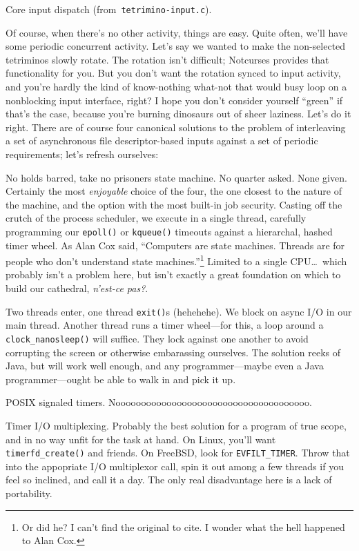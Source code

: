 \begin{listing}[!htbp]
\inputminted[]{C}{code/tetrimino-inputcore.h}
\caption{Core input dispatch (from~\texttt{tetrimino-input.c}).}
\label{list:tetrimino-inputcore}
\end{listing}

Of course, when there's no other activity, things are easy. Quite often, we'll
have some periodic concurrent activity. Let's say we wanted to make the non-selected
tetriminos slowly rotate. The rotation isn't difficult; Notcurses provides
that functionality for you. But you don't want the rotation synced to input
activity, and you're hardly the kind of know-nothing what-not that would
busy loop on a nonblocking input interface, right? I hope you don't consider
yourself ``green'' if that's the case, because you're burning dinosaurs out
of sheer laziness. Let's do it right. There are of course four canonical
solutions to the problem of interleaving a set of asynchronous file descriptor-based
inputs against a set of periodic requirements; let's refresh ourselves:

\begin{denseitemize}
\item{No holds barred, take no prisoners state machine. No quarter asked.
    None given. Certainly the most \textit{enjoyable} choice of the four, the
    one closest to the nature of the machine, and the option with the most
    built-in job security. Casting off the crutch of the process scheduler, we
    execute in a single thread, carefully programming our
    \texttt{epoll()}\cite{epoll7} or \texttt{kqueue()}\cite{kqueue2} timeouts
    against a hierarchal, hashed timer wheel\cite{timerwheels}. As Alan Cox
    said, ``Computers are state machines. Threads are for people who don't
    understand state machines.''\footnote{Or did he? I can't find the original
    to cite. I wonder what the hell happened to Alan Cox.} Limited to a single
  CPU\ldots\ which probably isn't a problem here, but isn't exactly a great foundation
  on which to build our cathedral, \textfrench{\textit{n'est-ce pas?}}.}
\item{Two threads enter, one thread \texttt{exit()}s (hehehehe). We block on
    async I/O in our main thread. Another thread runs a timer wheel---for this,
    a loop around a \texttt{clock\_nanosleep()} will suffice. They
    lock against one another to avoid corrupting the screen or otherwise
    embarassing ourselves. The solution reeks of Java, but will work well
    enough, and any programmer---maybe even a Java programmer---ought be able
    to walk in and pick it up.}
\item{POSIX signaled timers. Noooooooooooooooooooooooooooooooooooooo.}
\item{Timer I/O multiplexing. Probably the best solution for a program of true
    scope, and in no way unfit for the task at hand. On Linux, you'll want
    \texttt{timerfd\_create()} and friends. On FreeBSD, look for \texttt{EVFILT\_TIMER}.
    Throw that into the appopriate I/O multiplexor call, spin it out among a
    few threads if you feel so inclined\cite{libtorque}, and call it a day.
  The only real disadvantage here is a lack of portability.}
\end{denseitemize}

